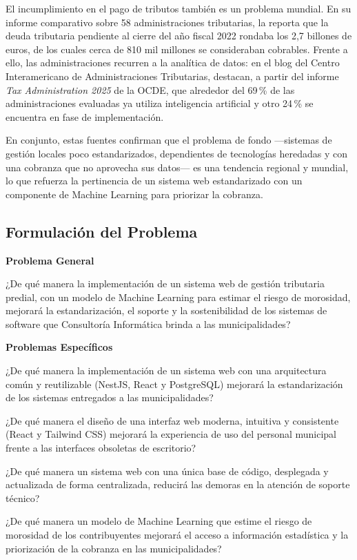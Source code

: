 \documentclass[12pt,a4paper]{report}
\newcommand{\subtitulo}[1]{\par\vspace{4pt}\noindent\textbf{#1}\par}
\begin{document}
El incumplimiento en el pago de tributos también es un problema mundial. En su informe comparativo sobre 58 administraciones tributarias, la \textcite{ocde2024} reporta que la deuda tributaria pendiente al cierre del año fiscal 2022 rondaba los 2,7 billones de euros, de los cuales cerca de 810 mil millones se consideraban cobrables. Frente a ello, las administraciones recurren a la analítica de datos: en el blog del Centro Interamericano de Administraciones Tributarias, \textcite{collosa2025} destacan, a partir del informe \textit{Tax Administration 2025} de la OCDE, que alrededor del 69\,\% de las administraciones evaluadas ya utiliza inteligencia artificial y otro 24\,\% se encuentra en fase de implementación.

En conjunto, estas fuentes confirman que el problema de fondo ---sistemas de gestión locales poco estandarizados, dependientes de tecnologías heredadas y con una cobranza que no aprovecha sus datos--- es una tendencia regional y mundial, lo que refuerza la pertinencia de un sistema web estandarizado con un componente de Machine Learning para priorizar la cobranza.

\subsection{Formulación del Problema}

\subtitulo{Problema General}

¿De qué manera la implementación de un sistema web de gestión tributaria predial, con un modelo de Machine Learning para estimar el riesgo de morosidad, mejorará la estandarización, el soporte y la sostenibilidad de los sistemas de software que Consultoría Informática brinda a las municipalidades?

\subtitulo{Problemas Específicos}

¿De qué manera la implementación de un sistema web con una arquitectura común y reutilizable (NestJS, React y PostgreSQL) mejorará la estandarización de los sistemas entregados a las municipalidades?

¿De qué manera el diseño de una interfaz web moderna, intuitiva y consistente (React y Tailwind CSS) mejorará la experiencia de uso del personal municipal frente a las interfaces obsoletas de escritorio?

¿De qué manera un sistema web con una única base de código, desplegada y actualizada de forma centralizada, reducirá las demoras en la atención de soporte técnico?

¿De qué manera un modelo de Machine Learning que estime el riesgo de morosidad de los contribuyentes mejorará el acceso a información estadística y la priorización de la cobranza en las municipalidades?
\end{document}
